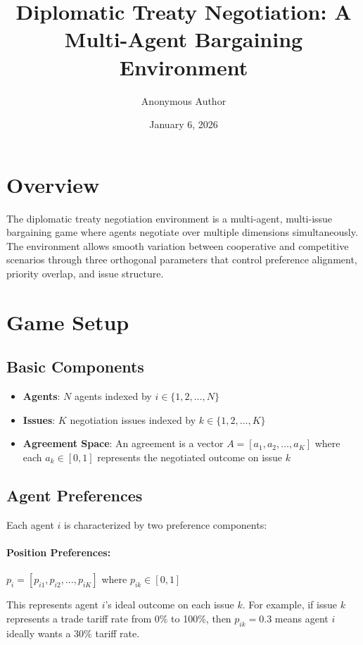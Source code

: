 \documentclass[11pt]{article}
\title{Diplomatic Treaty Negotiation: A Multi-Agent Bargaining Environment}
\author{Anonymous Author}
\date{January 6, 2026}
\begin{document}
\maketitle

\section{Overview}

The diplomatic treaty negotiation environment is a multi-agent, multi-issue bargaining game where agents negotiate over multiple dimensions simultaneously. The environment allows smooth variation between cooperative and competitive scenarios through three orthogonal parameters that control preference alignment, priority overlap, and issue structure.

\section{Game Setup}

\subsection{Basic Components}

\begin{itemize}
    \item \textbf{Agents}: $N$ agents indexed by $i \in \{1, 2, \ldots, N\}$
    \item \textbf{Issues}: $K$ negotiation issues indexed by $k \in \{1, 2, \ldots, K\}$
    \item \textbf{Agreement Space}: An agreement is a vector $A = [a_1, a_2, \ldots, a_K]$ where each $a_k \in [0,1]$ represents the negotiated outcome on issue $k$
\end{itemize}

\subsection{Agent Preferences}

Each agent $i$ is characterized by two preference components:

\paragraph{Position Preferences:} $p_i = [p_{i1}, p_{i2}, \ldots, p_{iK}]$ where $p_{ik} \in [0,1]$

This represents agent $i$'s ideal outcome on each issue $k$. For example, if issue $k$ represents a trade tariff rate from 0\% to 100\%, then $p_{ik} = 0.3$ means agent $i$ ideally wants a 30\% tariff rate.
\end{document}

